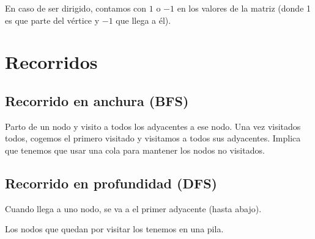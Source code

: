 En caso de ser dirigido, contamos con $1$ o $-1$ en los valores de la matriz (donde 1 es que parte del vértice y $-1$ que llega a él).

\section{Recorridos}
\subsection{Recorrido en anchura (BFS)}
Parto de un nodo y visito a todos los adyacentes a ese nodo. Una vez visitados todos, cogemos el primero visitado y visitamos a todos sus adyacentes.
Implica que tenemos que usar una cola para mantener los nodos no visitados.

\subsection{Recorrido en profundidad (DFS)}
Cuando llega a uno nodo, se va a el primer adyacente (hasta abajo).

Los nodos que quedan por visitar los tenemos en una pila.

